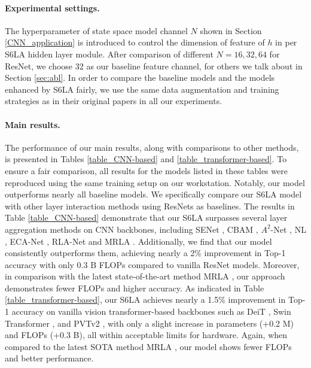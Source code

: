 \paragraph{Experimental settings.} The hyperparameter of state space model channel $N$ shown in Section \ref{CNN_application} is introduced to control the dimension of feature of $h$ in per S6LA hidden layer module. After comparison of different $N=16,32,64$ for ResNet, we choose 32 as our baseline feature channel, for others we talk about in Section \ref{sec:abl}. In order to compare the baseline models and the models enhanced by S6LA fairly, we use the same data augmentation and training strategies as in their original papers  \citep{zhao2021recurrence,fang2023cross} in all our experiments.

\paragraph{Main results.} The performance of our main results, along with comparisons to other methods, is presented in Tables \ref{table_CNN-based} and \ref{table_transformer-based}. To ensure a fair comparison, all results for the models listed in these tables were reproduced using the same training setup on our workstation. Notably, our model outperforms nearly all baseline models. We specifically compare our S6LA model with other layer interaction methods using ResNets as baselines. The results in Table \ref{table_CNN-based} demonstrate that our S6LA surpasses several layer aggregation methods on CNN backbones, including SENet \citep{hu2018squeeze}, CBAM \citep{woo2018cbam}, $A^2$-Net \citep{chen20182}, NL \citep{wang2018non}, ECA-Net \citep{wang2020eca}, RLA-Net \citep{zhao2021recurrence} and MRLA \citep{fang2023cross}. Additionally, we find that our model consistently outperforms them, achieving nearly a 2\% improvement in Top-1 accuracy with only 0.3 B FLOPs compared to vanilla ResNet models.
Moreover, in comparison with the latest state-of-the-art method MRLA \citep{fang2023cross}, our approach demonstrates fewer FLOPs and higher accuracy. As indicated in Table \ref{table_transformer-based}, our S6LA achieves nearly a 1.5\% improvement in Top-1 accuracy on vanilla vision transformer-based backbones such as DeiT \citep{touvron2021training}, Swin Transformer \citep{liu2021swin}, and PVTv2 \citep{wang2022pvt}, with only a slight increase in parameters (+0.2 M) and FLOPs (+0.3 B), all within acceptable limits for hardware. Again, when compared to the latest SOTA method MRLA \citep{fang2023cross}, our model shows fewer FLOPs and better performance.




